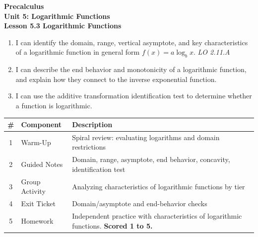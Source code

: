 \documentclass[10pt]{article}
\begin{document}
\vspace{-0.8in}

\begin{center}
  {\color{white}\textbf{\LARGE Precalculus}}\\[4pt]
  {\color{skymid}\large\textbf{Unit 5: Logarithmic Functions}}\\[6pt]
  {\color{white}\textbf{\large Lesson 5.3 \quad Logarithmic Functions}}
\end{center}

\vspace{0.22in}
\namedateperiod
\vspace{0.18in}

\begin{learningtargetbox}
\small
\begin{enumerate}[leftmargin=1.5em, itemsep=5pt]
  \item I can identify the domain, range, vertical asymptote, and key characteristics of a
        logarithmic function in general form $f(x) = a\log_b x$.
        \hfill\textit{LO 2.11.A}
  \item I can describe the end behavior and monotonicity of a logarithmic function, and
        explain how they connect to the inverse exponential function.
  \item I can use the additive transformation identification test to determine whether a
        function is logarithmic.
\end{enumerate}
\end{learningtargetbox}

\vspace{0.14in}

\begin{tocbox}
\small
\renewcommand{\arraystretch}{1.5}
\begin{tabularx}{\linewidth}{@{} c l X @{}}
\rowcolor{sky}
\textbf{\#} & \textbf{Component} & \textbf{Description} \\
\midrule
1 & Warm-Up        & Spiral review: evaluating logarithms and domain restrictions \\
2 & Guided Notes   & Domain, range, asymptote, end behavior, concavity, identification test \\
3 & Group Activity & Analyzing characteristics of logarithmic functions by tier \\
4 & Exit Ticket    & Domain/asymptote and end-behavior checks \\
5 & Homework       & Independent practice with characteristics of logarithmic functions. \textbf{Scored 1 to 5.} \\
\end{tabularx}
\end{tocbox}
\end{document}
